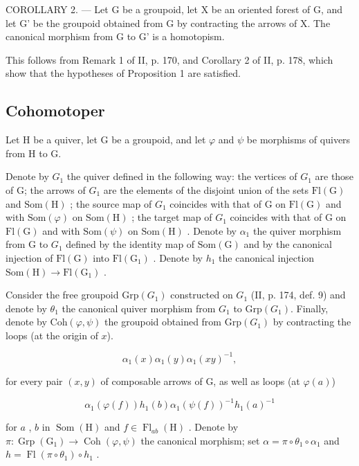 COROLLARY 2. --- Let G be a groupoid, let X be an oriented forest of G, and let G' be the groupoid obtained from G by contracting the arrows of X. The canonical morphism from G to G' is a homotopism.

This follows from Remark 1 of II, p. 170, and Corollary 2 of II, p. 178, which show that the hypotheses of Proposition 1 are satisfied.

\subsection{Cohomotoper}

Let H be a quiver, let G be a groupoid, and let \(\varphi\) and \(\psi\) be morphisms of quivers from H to G.

Denote by \(G_{1}\) the quiver defined in the following way: the vertices of \(G_{1}\) are those of G; the arrows of \(G_{1}\) are the elements of the disjoint union of the sets \(\mathrm{Fl(G)}\) and \(\mathrm{Som(H)}\) ; the source map of \(G_{1}\) coincides with that of G on \(\mathrm{Fl(G)}\) and with \(\mathrm{Som}(\varphi)\) on \(\mathrm{Som(H)}\) ; the target map of \(G_{1}\) coincides with that of G on \(\mathrm{Fl(G)}\) and with \(\mathrm{Som}(\psi)\) on \(\mathrm{Som(H)}\) . Denote by \(\alpha_{1}\) the quiver morphism from G to \(G_{1}\) defined by the identity map of \(\mathrm{Som(G)}\) and by the canonical injection of \(\mathrm{Fl(G)}\) into \(\mathrm{Fl(G_{1})}\) . Denote by \(h_{1}\) the canonical injection \(\mathrm{Som(H)} \to \mathrm{Fl(G_{1})}\) .

Consider the free groupoid \(\mathrm{Grp}(G_{1})\) constructed on \(G_{1}\) (II, p. 174, def. 9) and denote by \(\theta_{1}\) the canonical quiver morphism from \(G_{1}\) to \(\mathrm{Grp}(G_{1})\). Finally, denote by \(\mathrm{Coh}(\varphi,\psi)\) the groupoid obtained from \(\mathrm{Grp}(G_{1})\) by contracting the loops (at the origin of \(x\)).

\[
\alpha_ {1} (x) \alpha_ {1} (y) \alpha_ {1} (x y) ^ {- 1},\tag{1}
\]

for every pair \((x,y)\) of composable arrows of G, as well as loops (at \(\varphi(a)\))

\[
\alpha_ {1} (\varphi (f)) h _ {1} (b) \alpha_ {1} (\psi (f)) ^ {- 1} h _ {1} (a) ^ {- 1}\tag{2}
\]

for \(a\) , \(b\) in \(\operatorname{Som}(\mathrm{H})\) and \(f \in \operatorname{Fl}_{ab}(\mathrm{H})\) . Denote by \(\pi: \operatorname{Grp}(\mathrm{G}_1) \to \operatorname{Coh}(\varphi, \psi)\) the canonical morphism; set \(\alpha = \pi \circ \theta_1 \circ \alpha_1\) and \(h = \operatorname{Fl}(\pi \circ \theta_1) \circ h_1\) .

